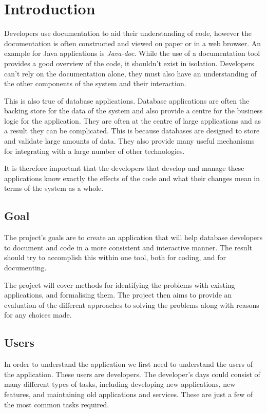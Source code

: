 \chapter{Introduction}\label{introduction}

Developers use documentation to aid their understanding of code, however the
documentation is often constructed and viewed on paper or in a web browser. An
example for Java applications is \textit{Java-doc}\cite{javadoc}. While the use
of a documentation tool provides a good overview of the code, it shouldn't
exist in isolation.  Developers can't rely on the documentation alone, they must
also have an understanding of the other components of the system and their
interaction.

This is also true of database applications. Database applications are often the
backing store for the data of the system and also provide a centre for the
business logic for the application. They are often at the centre of large
applications and as a result they can be complicated. This is because databases
are designed to store and validate large amounts of data. They also provide many
useful mechanisms for integrating with a large number of other technologies.

It is therefore important that the developers that develop and manage
these applications know exactly the effects of the code and what their
changes mean in terms of the system as a whole.

\section{Goal}\label{project-goal}

The project's goals are to create an application that will help database
developers to document and code in a more consistent and interactive
manner. The result should try to accomplish this within one tool, both for coding, and for documenting.

The project will cover methods for identifying the problems with existing
applications, and formalising them. The project then aims to provide an
evaluation of the different approaches to solving the problems along with
reasons for any choices made.

\section{Users}\label{users}

In order to understand the application we first need to understand the
users of the application. These users are developers. The developer's
days could consist of many different types of tasks, including developing new
applications, new features, and maintaining old applications and
services. These are just a few of the most common tasks required.

